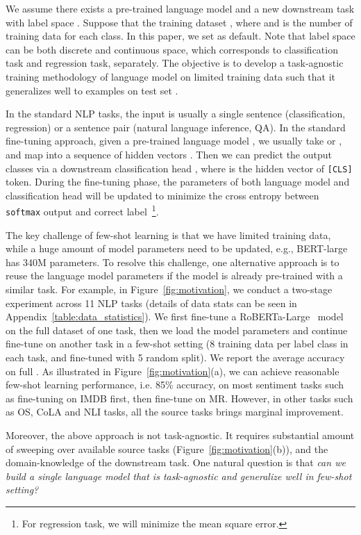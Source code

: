 \documentclass{article}
\begin{document}
We assume there exists a pre-trained language model  and a new downstream task  with label space . Suppose that the training dataset , where  and  is the number of training data for each class. In this paper, we set  as default. Note that label space  can be both discrete and continuous space, which corresponds to classification task and regression task, separately. The objective is to develop a task-agnostic training methodology of language model  on limited training data  such that it generalizes well to examples on test set . 

In the standard NLP tasks, the input  is usually a single sentence  (classification, regression) or a sentence pair  (natural language inference, QA). In the standard fine-tuning approach, given a pre-trained language model , we usually take
 or , and map  into a sequence of hidden vectors . Then we can predict the output classes via a downstream classification head  , where  is the hidden vector of \texttt{[CLS]} token. During the fine-tuning phase, the parameters of both language model  and classification head  will be updated to minimize the cross entropy between \texttt{softmax} output and correct label~\footnote{For regression task, we will minimize the mean square error.}.

The key challenge of few-shot learning is that we have limited training data, while a huge amount of model parameters need to be updated, e.g., BERT-large has 340M parameters. To resolve this challenge, one alternative approach is to reuse the language model parameters if the model is already pre-trained with a similar task. For example, in Figure~\ref{fig:motivation}, we conduct a two-stage experiment across 11 NLP tasks (details of data stats can be seen in Appendix~\ref{table:data_statistics}). We first fine-tune a RoBERTa-Large~\citep{liu2019roberta} model on the full dataset of one task, then we load the model parameters  and continue fine-tune on another task in a few-shot setting (8 training data per label class in each task, and fine-tuned with 5 random split). We report the average accuracy on full . As illustrated in Figure~\ref{fig:motivation}(a), we can achieve reasonable few-shot learning performance, i.e. 85\% accuracy, on most sentiment tasks such as fine-tuning on IMDB first, then fine-tune on MR. However, in other tasks such as OS, CoLA and NLI tasks, all the source tasks brings marginal improvement.

Moreover, the above approach is not task-agnostic. It requires substantial amount of sweeping over available source tasks (Figure~\ref{fig:motivation}(b)), and the domain-knowledge of the downstream task. One natural question is that \textit{can we build a single language model  that is task-agnostic and generalize well in few-shot setting?}
\end{document}
